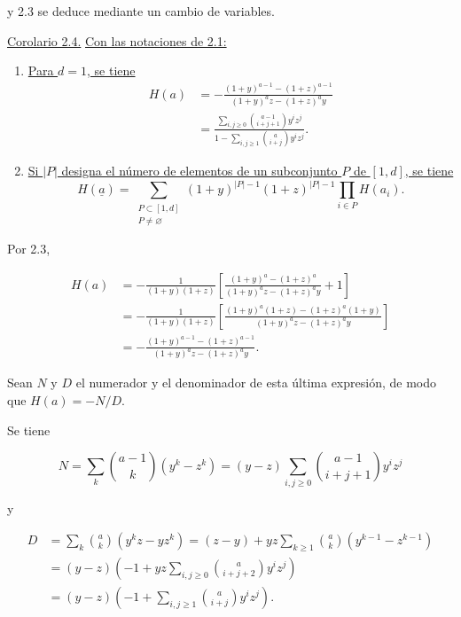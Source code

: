 y 2.3 se deduce mediante un cambio de variables.

\pageoriginale

\medskip
\noindent\underline{Corolario 2.4.}\quad
\underline{Con las notaciones de 2.1:}

\begin{enumerate}[label=(\roman*),leftmargin=2.6em]
\item \underline{Para $d=1$, se tiene}
\begin{equation*}
\begin{aligned}
H(a)
&=-\frac{(1+y)^{a-1}-(1+z)^{a-1}}
{(1+y)^az-(1+z)^ay}\\[1ex]
&=\frac{\displaystyle\sum_{i,j\geq0}
\binom{a-1}{i+j+1}y^iz^j}
{\displaystyle1-\sum_{i,j\geq1}\binom{a}{i+j}y^iz^j}.
\end{aligned}
\end{equation*}

\item \underline{Si $|P|$ designa el número de elementos de un subconjunto
$P$ de $[1,d]$, se tiene}
\begin{equation*}
H(\underline a)=
\sum_{\substack{P\subset[1,d]\\P\ne\varnothing}}
(1+y)^{|P|-1}(1+z)^{|P|-1}
\prod_{i\in P}H(a_i).
\end{equation*}
\end{enumerate}

Por 2.3,

\begin{align*}
H(a)
&=-\frac{1}{(1+y)(1+z)}\left[
\frac{(1+y)^a-(1+z)^a}{(1+y)^az-(1+z)^ay}+1\right]\\
&=-\frac{1}{(1+y)(1+z)}\left[
\frac{(1+y)^a(1+z)-(1+z)^a(1+y)}
{(1+y)^az-(1+z)^ay}\right]\\
&=-\frac{(1+y)^{a-1}-(1+z)^{a-1}}
{(1+y)^az-(1+z)^ay}.
\end{align*}

Sean $N$ y $D$ el numerador y el denominador de esta última expresión, de
modo que $H(a)=-N/D$.

\pageoriginale

Se tiene

\begin{equation*}
N=\sum_k\binom{a-1}{k}(y^k-z^k)
=(y-z)\sum_{i,j\geq0}\binom{a-1}{i+j+1}y^iz^j
\end{equation*}

y

\begin{align*}
D
&=\sum_k\binom ak(y^kz-yz^k)
=(z-y)+yz\sum_{k\geq1}\binom ak(y^{k-1}-z^{k-1})\\
&=(y-z)\left(-1+yz\sum_{i,j\geq0}
\binom a{i+j+2}y^iz^j\right)\\
&=(y-z)\left(-1+\sum_{i,j\geq1}
\binom a{i+j}y^iz^j\right).
\end{align*}

